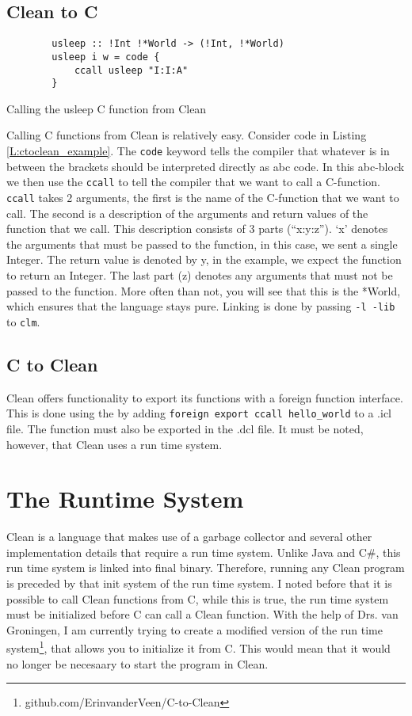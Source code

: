 \documentclass{scrartcl}
\newenvironment{longlisting}{\captionsetup{type=listing}}{}
\begin{document}
\subsection{Clean to C}
\begin{longlisting}
	\begin{verbatim}
		usleep :: !Int !*World -> (!Int, !*World)
		usleep i w = code {
			ccall usleep "I:I:A"
		}
	\end{verbatim}
	\caption{Calling the usleep C function from Clean\label{L:ctoclean_example}}
\end{longlisting}
Calling C functions from Clean is relatively easy.
Consider code in Listing \ref{L:ctoclean_example}.
The \texttt{code} keyword tells the compiler that whatever is in between the brackets should be interpreted directly as abc code.
In this abc-block we then use the \texttt{ccall} to tell the compiler that we want to call a C-function.
\texttt{ccall} takes 2 arguments, the first is the name of the C-function that we want to call.
The second is a description of the arguments and return values of the function that we call.
This description consists of 3 parts (``x:y:z'').
`x' denotes the arguments that must be passed to the function, in this case, we sent a single Integer.
The return value is denoted by y, in the example, we expect the function to return an Integer.
The last part (z) denotes any arguments that must not be passed to the function.
More often than not, you will see that this is the *World, which ensures that the language stays pure.
Linking is done by passing \texttt{-l -lib} to \texttt{clm}.

\subsection{C to Clean}
Clean offers functionality to export its functions with a foreign function interface.
This is done using the by adding \texttt{foreign export ccall hello_world} to a .icl file.
The function must also be exported in the .dcl file.
It must be noted, however, that Clean uses a run time system.

\section{The Runtime System}
Clean is a language that makes use of a garbage collector and several other implementation details that require a run time system.
Unlike Java and C\#, this run time system is linked into final binary.
Therefore, running any Clean program is preceded by that init system of the run time system.
I noted before that it is possible to call Clean functions from C, while this is true, the run time system must be initialized before C can call a Clean function.
With the help of Drs. van Groningen, I am currently trying to create a modified version of the run time system\footnote{github.com/ErinvanderVeen/C-to-Clean}, that allows you to initialize it from C.
This would mean that it would no longer be necesaary to start the program in Clean.
\end{document}
